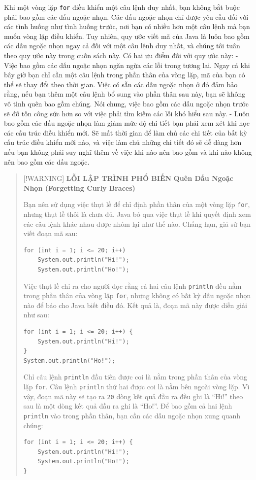 Khi một vòng lặp \texttt{for} điều khiển một câu lệnh duy nhất, bạn
không bắt buộc phải bao gồm các dấu ngoặc nhọn. Các dấu ngoặc nhọn chỉ
được yêu cầu đối với các tình huống như tình huống trước, nơi bạn có
nhiều hơn một câu lệnh mà bạn muốn vòng lặp điều khiển. Tuy nhiên, quy
ước viết mã của Java là luôn bao gồm các dấu ngoặc nhọn ngay cả đối với
một câu lệnh duy nhất, và chúng tôi tuân theo quy ước này trong cuốn
sách này. Có hai ưu điểm đối với quy ước này: - Việc bao gồm các dấu
ngoặc nhọn ngăn ngừa các lỗi trong tương lai. Ngay cả khi bây giờ bạn
chỉ cần một câu lệnh trong phần thân của vòng lặp, mã của bạn có thể sẽ
thay đổi theo thời gian. Việc có sẵn các dấu ngoặc nhọn ở đó đảm bảo
rằng, nếu bạn thêm một câu lệnh bổ sung vào phần thân sau này, bạn sẽ
không vô tình quên bao gồm chúng. Nói chung, việc bao gồm các dấu ngoặc
nhọn trước sẽ đỡ tốn công sức hơn so với việc phải tìm kiếm các lỗi khó
hiểu sau này. - Luôn bao gồm các dấu ngoặc nhọn làm giảm mức độ chi tiết
bạn phải xem xét khi học các cấu trúc điều khiển mới. Sẽ mất thời gian
để làm chủ các chi tiết của bất kỳ cấu trúc điều khiển mới nào, và việc
làm chủ những chi tiết đó sẽ dễ dàng hơn nếu bạn không phải suy nghĩ
thêm về việc khi nào nên bao gồm và khi nào không nên bao gồm các dấu
ngoặc.

\begin{quote}
{[}!WARNING{]} \textbf{LỖI LẬP TRÌNH PHỔ BIẾN} \textbf{Quên Dấu Ngoặc
Nhọn (Forgetting Curly Braces)}

Bạn nên sử dụng việc thụt lề để chỉ định phần thân của một vòng lặp
\texttt{for}, nhưng thụt lề thôi là chưa đủ. Java bỏ qua việc thụt lề
khi quyết định xem các câu lệnh khác nhau được nhóm lại như thế nào.
Chẳng hạn, giả sử bạn viết đoạn mã sau:

\begin{verbatim}
for (int i = 1; i <= 20; i++)
    System.out.println("Hi!");
    System.out.println("Ho!");
\end{verbatim}

Việc thụt lề chỉ ra cho người đọc rằng cả hai câu lệnh \texttt{println}
đều nằm trong phần thân của vòng lặp \texttt{for}, nhưng không có bất kỳ
dấu ngoặc nhọn nào để báo cho Java biết điều đó. Kết quả là, đoạn mã này
được diễn giải như sau:

\begin{verbatim}
for (int i = 1; i <= 20; i++) {
    System.out.println("Hi!");
}
System.out.println("Ho!");
\end{verbatim}

Chỉ câu lệnh \texttt{println} đầu tiên được coi là nằm trong phần thân
của vòng lặp \texttt{for}. Câu lệnh \texttt{println} thứ hai được coi là
nằm bên ngoài vòng lặp. Vì vậy, đoạn mã này sẽ tạo ra \texttt{20} dòng
kết quả đầu ra đều ghi là ``Hi!'' theo sau là một dòng kết quả đầu ra
ghi là ``Ho!''. Để bao gồm cả hai lệnh \texttt{println} vào trong phần
thân, bạn cần các dấu ngoặc nhọn xung quanh chúng:

\begin{verbatim}
for (int i = 1; i <= 20; i++) {
    System.out.println("Hi!");
    System.out.println("Ho!");
}
\end{verbatim}
\end{quote}

